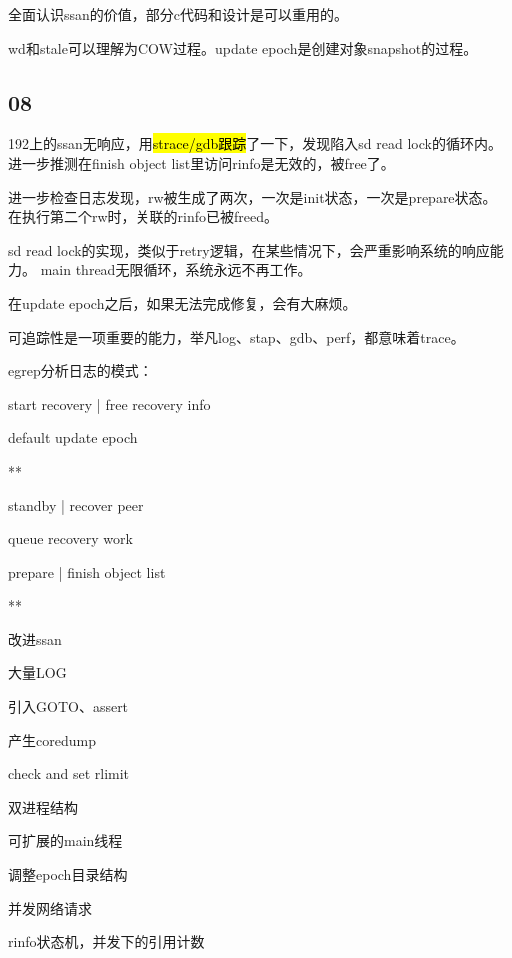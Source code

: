 全面认识ssan的价值，部分c代码和设计是可以重用的。

wd和stale可以理解为COW过程。update epoch是创建对象snapshot的过程。

\subsection{08}

192上的ssan无响应，用\hl{strace/gdb跟踪}了一下，发现陷入sd read lock的循环内。
进一步推测在finish object list里访问rinfo是无效的，被free了。

进一步检查日志发现，rw被生成了两次，一次是init状态，一次是prepare状态。
在执行第二个rw时，关联的rinfo已被freed。

sd read lock的实现，类似于retry逻辑，在某些情况下，会严重影响系统的响应能力。
main thread无限循环，系统永远不再工作。

在update epoch之后，如果无法完成修复，会有大麻烦。

\hrulefill

可追踪性是一项重要的能力，举凡log、stap、gdb、perf，都意味着trace。

egrep分析日志的模式：
\begin{enumbox}
\item start recovery | free recovery info
\item default update epoch
\item ***
\item standby | recover peer
\item queue recovery work
\item prepare | finish object list
\item ***
\end{enumbox}

\hrulefill

改进ssan
\begin{enumbox}
\item 大量LOG
\item 引入GOTO、assert
\item 产生coredump
\item check and set rlimit
\item 双进程结构
\item 可扩展的main线程
\item 调整epoch目录结构
\item 并发网络请求
\item rinfo状态机，并发下的引用计数
\end{enumbox}

\hrulefill

